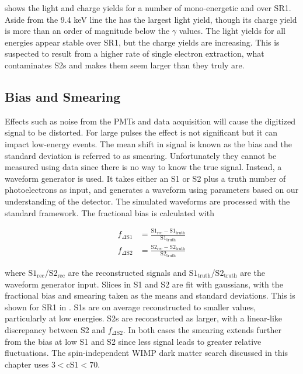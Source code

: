  shows the light and charge yields for a number of mono-energetic \gammarays and  over
SR1.  Aside from the 9.4 keV \metakr line the  \alphadecay has the largest light yield, though its charge yield is more than
an order of magnitude below the $\gamma$ values.  The light yields for all energies appear stable over SR1, but the charge yields are
increasing.  This is suspected to result from a higher rate of single electron extraction, what contaminates S2s and makes them seem
larger than they truly are.



\subsection{Bias and Smearing}
\label{subsec:det_char_bias_smearing}
Effects such as noise from the PMTs and data acquisition will cause the digitized signal to be distorted.  For large pulses the
effect is not significant but it can impact low-energy events.  The mean shift in signal is known as the bias and the standard deviation
is referred
to as smearing.  Unfortunately they cannot be measured using data since there is no way to know the true signal.  Instead, a waveform
generator is used.  It takes either an S1 or S2 plus a truth number of photoelectrons as input, and generates a waveform using parameters
based on our understanding of the detector.  The simulated waveforms are
processed with the standard framework.  The fractional bias is calculated with

\begin{subequations}
\begin{align}
f_{\Delta \mathrm{S1}} &= \frac{\mathrm{S1_{rec} - S1_{truth}}}{\mathrm{S1_{truth}}} \\[3pt]
f_{\Delta \mathrm{S2}} &= \frac{\mathrm{S2_{rec} - S2_{truth}}}{\mathrm{S2_{truth}}}
\end{align}
\end{subequations}

\noindent where $\mathrm{S1_{rec}}$/$\mathrm{S2_{rec}}$ are the reconstructed signals and $\mathrm{S1_{truth}}$/$\mathrm{S2_{truth}}$ are
the waveform generator input.  Slices in S1 and S2 are fit with gaussians, with the fractional bias and smearing taken as the means and
standard deviations.  This is shown for SR1 in .  S1s are on average reconstructed to smaller
values, particularly at low energies.  S2s are reconstructed as larger, with a linear-like discrepancy between S2 and
$f_{\Delta \mathrm{S2}}$.  In both cases the smearing extends further from the bias at low S1 and S2 since less signal leads to greater
relative fluctuations.  The spin-independent WIMP dark matter search discussed in this chapter uses $3 < \mathrm{cS1} < 70$.

